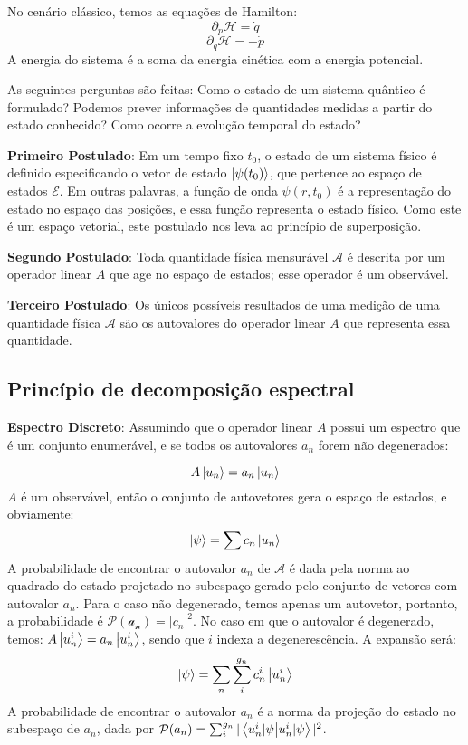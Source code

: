 \documentclass{article}
\begin{document}
	No cenário clássico, temos as equações de Hamilton:
	$$\partial_{p} \mathcal{H}=\dot{q}$$
	$$\partial _{q}\mathcal{H}=-\dot{p}$$
	A energia do sistema é a soma da energia cinética com a energia potencial.
	
	As seguintes perguntas são feitas: Como o estado de um sistema quântico é formulado? Podemos prever informações de quantidades medidas a partir do estado conhecido? Como ocorre a evolução temporal do estado?
	
	\textbf{Primeiro Postulado}: Em um tempo fixo $t_{0}$, o estado de um sistema físico é definido especificando o vetor de estado $\ket{\psi(t_{0})}$, que pertence ao espaço de estados $\mathcal{E}$.
	Em outras palavras, a função de onda $\psi(r,t_{0})$ é a representação do estado no espaço das posições, e essa função representa o estado físico. Como este é um espaço vetorial, este postulado nos leva ao princípio de superposição.
	
	\textbf{Segundo Postulado}: Toda quantidade física mensurável $\mathcal{A}$ é descrita por um operador linear $A$ que age no espaço de estados; esse operador é um observável.
	
	\textbf{Terceiro Postulado}: Os únicos possíveis resultados de uma medição de uma quantidade física $\mathcal{A}$ são os autovalores do operador linear $A$ que representa essa quantidade.
	
	\subsection{Princípio de decomposição espectral}
	
	\textbf{Espectro Discreto}:
	Assumindo que o operador linear $A$ possui um espectro que é um conjunto enumerável, e se todos os autovalores $a_{n}$ forem não degenerados:
	
	$$A \ket{u_{n}}=a_{n}\ket{u_{n}}  $$
	$A$ é um observável, então o conjunto de autovetores gera o espaço de estados, e obviamente:
	$$\ket{\psi}=\sum c_{n}\ket{u_{n}}$$
	A probabilidade de encontrar o autovalor $a_{n}$ de $\mathcal{A}$ é dada pela norma ao quadrado do estado projetado no subespaço gerado pelo conjunto de vetores com autovalor $a_{n}$. Para o caso não degenerado, temos apenas um autovetor, portanto, a probabilidade é $\mathcal{P(a_{n})}=|c_{n}|^{2}$.
	No caso em que o autovalor é degenerado, temos: $A\ket{u^{i}_{n}}=a_{n}\ket{u^{i}_{n}}$, sendo que $i$ indexa a degenerescência. A expansão será:
	$$\ket{\psi}=\sum_{n}\sum ^{g_{n}}_{i}c^{i}_{n}\ket{u^{i}_{n}}  $$
	A probabilidade de encontrar o autovalor $a_n$ é a norma da projeção do estado no subespaço de $a_n$, dada por $\mathcal{P}(a_{n})=\sum ^{g_{n}}_{i}|\braket{ u_{n}^{i} |\psi }|^{2}$.
	
\end{document}
